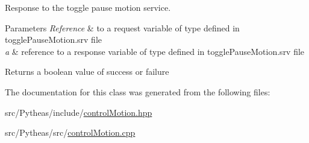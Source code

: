 Response to the toggle pause motion service. 


\begin{DoxyParams}{Parameters}
{\em Reference} & to a request variable of type defined in toggle\+Pause\+Motion.\+srv file \\
\hline
{\em a} & reference to a response variable of type defined in toggle\+Pause\+Motion.\+srv file \\
\hline
\end{DoxyParams}
\begin{DoxyReturn}{Returns}
a boolean value of success or failure 
\end{DoxyReturn}


The documentation for this class was generated from the following files\+:\begin{DoxyCompactItemize}
\item 
src/\+Pytheas/include/\hyperlink{control_motion_8hpp}{control\+Motion.\+hpp}\item 
src/\+Pytheas/src/\hyperlink{control_motion_8cpp}{control\+Motion.\+cpp}\end{DoxyCompactItemize}
